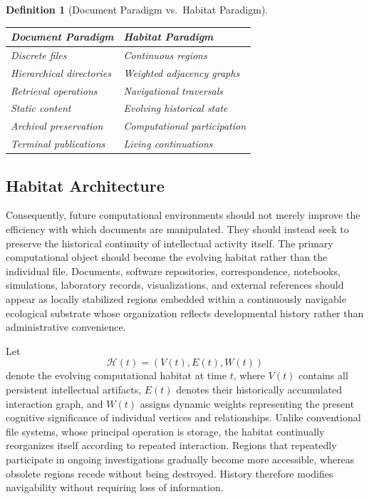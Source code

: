 \documentclass[12pt,oneside]{article}
\newtheorem{definition}{Definition}[section]
\theoremstyle{remark}
\begin{document}
\begin{definition}[Document Paradigm vs.\ Habitat Paradigm]
\centering
\begin{tabularx}{\textwidth}{|>{\raggedright\arraybackslash}X|
                              >{\raggedright\arraybackslash}X|}
\hline
\textbf{Document Paradigm} &
\textbf{Habitat Paradigm} \\
\hline
Discrete files &
Continuous regions \\
Hierarchical directories &
Weighted adjacency graphs \\
Retrieval operations &
Navigational traversals \\
Static content &
Evolving historical state \\
Archival preservation &
Computational participation \\
Terminal publications &
Living continuations \\
\hline
\end{tabularx}
\end{definition}

\subsection{Habitat Architecture}

Consequently, future computational environments should not merely improve the efficiency with which documents are manipulated. They should instead seek to preserve the historical continuity of intellectual activity itself. The primary computational object should become the evolving habitat rather than the individual file. Documents, software repositories, correspondence, notebooks, simulations, laboratory records, visualizations, and external references should appear as locally stabilized regions embedded within a continuously navigable ecological substrate whose organization reflects developmental history rather than administrative convenience.

Let
\[
\mathcal{H}(t) = (V(t), E(t), W(t))
\]
denote the evolving computational habitat at time \(t\), where \(V(t)\) contains all persistent intellectual artifacts, \(E(t)\) denotes their historically accumulated interaction graph, and \(W(t)\) assigns dynamic weights representing the present cognitive significance of individual vertices and relationships. Unlike conventional file systems, whose principal operation is storage, the habitat continually reorganizes itself according to repeated interaction. Regions that repeatedly participate in ongoing investigations gradually become more accessible, whereas obsolete regions recede without being destroyed. History therefore modifies navigability without requiring loss of information.
\end{document}
